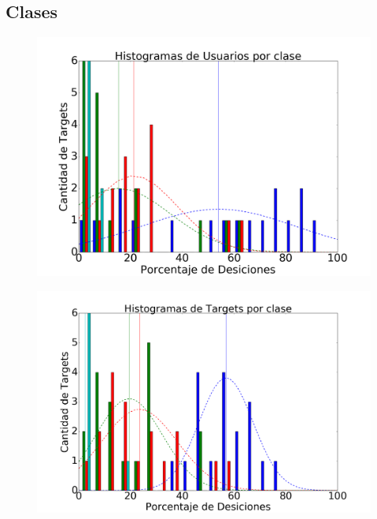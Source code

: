 \documentclass{beamer}
\begin{document}
\subsection{Clases}

\begin{frame}
\begin{figure}[c]
 \centering
  \begin{minipage}[c]{1\textwidth}
	\centering	
	\includegraphics[scale=0.27]{hist_users.png}
  \end{minipage}
\end{figure}
\end{frame}

\begin{frame}
\begin{figure}[c]
 \centering
  \begin{minipage}[c]{1\textwidth}
	\centering	
	\includegraphics[scale=0.27]{hist_targets.png}
  \end{minipage}
\end{figure}
\end{frame}
\end{document}
